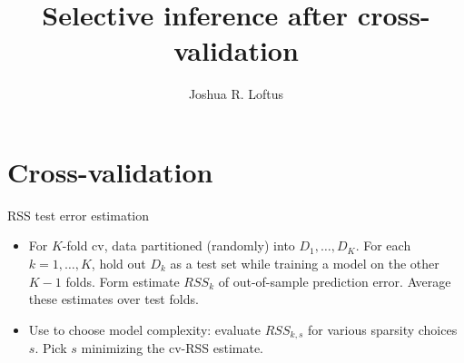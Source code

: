 \documentclass{beamer}
\title[CV inference]{Selective inference after cross-validation}
\author[J. R. Loftus]{Joshua R. Loftus}
\date
\begin{document}
\begin{frame}
  \titlepage %
\end{frame}



\section{Cross-validation}
\label{sec:cv}

\begin{frame}{RSS test error estimation}

  \begin{itemize}

  \item For $K$-fold cv, data partitioned (randomly) into $D_1,
    \ldots, D_K$. For each $k = 1,\ldots,K$, hold out $D_k$ as a test
    set while training a model on the other $K-1$ folds. Form estimate
    $RSS_k$ of out-of-sample prediction error. Average these estimates
    over test folds. 

  \item Use to choose model complexity: evaluate $RSS_{k,s}$ for
    various sparsity choices $s$. Pick $s$ minimizing the cv-RSS estimate.

  \end{itemize}
  
\end{frame}
\end{document}
